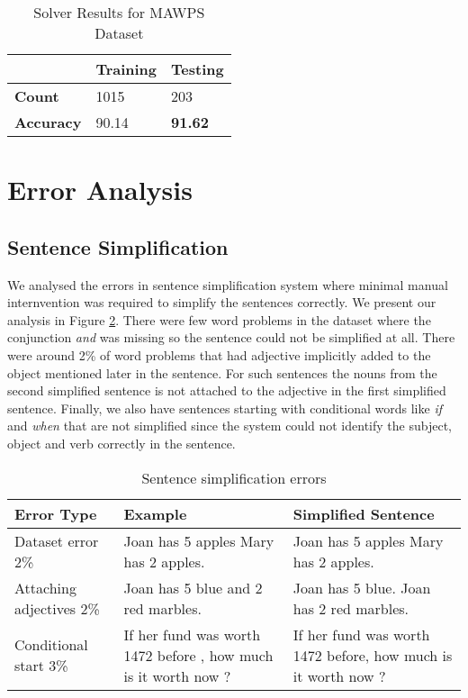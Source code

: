 \documentclass[11pt]{article}
\begin{document}
\begin{table}[H]
\centering
\begin{tabular}{|m{3cm}|m{2cm}|m{2cm}|}
\hline
 & \textbf{Training} & \textbf{Testing} \\ \hline
 \textbf{Count} & 1015 & 203 \\ \hline
 \textbf{Accuracy} & 90.14 & \textbf{91.62} \\ \hline
\end{tabular}
\caption{Solver Results for MAWPS Dataset}
\label{figure:14}
\end{table}

\section{Error Analysis}
\subsection{Sentence Simplification}
We analysed the errors in sentence simplification system where minimal manual internvention was required to simplify the sentences correctly. We present our analysis in Figure \ref{figure:15}. There were few word problems in the dataset where the conjunction \textit{and} was missing so the sentence could not be simplified at all. There were around 2\% of word problems that had adjective implicitly added to the object mentioned later in the sentence. For such sentences the nouns from the second simplified sentence is not attached to the adjective in the first simplified sentence. Finally, we also have sentences starting with conditional words like \textit{if} and \textit{when} that are not simplified since the system could not identify the subject, object and verb correctly in the sentence.

\begin{table}[h!]
\centering
\begin{tabular}{|m{1cm}|m{3cm}|m{3cm}|}
\hline
 \textbf{Error Type} & \textbf{Example}  & \textbf{Simplified Sentence}\\ \hline
 Dataset error 2\% & Joan has 5 apples Mary has 2 apples. & Joan has 5 apples Mary has 2 apples. \\ \hline
Attaching adjectives 2\% & Joan has 5 blue and 2 red marbles. & Joan has 5 blue. Joan has 2 red marbles. \\ \hline
Conditional start 3\% & If her fund was worth 1472 before , how much is it worth now ? & If her fund was worth 1472 before, how much is it worth now ? \\ \hline
\end{tabular}
\caption{Sentence simplification errors}
\label{figure:15}
\end{table}
\end{document}
